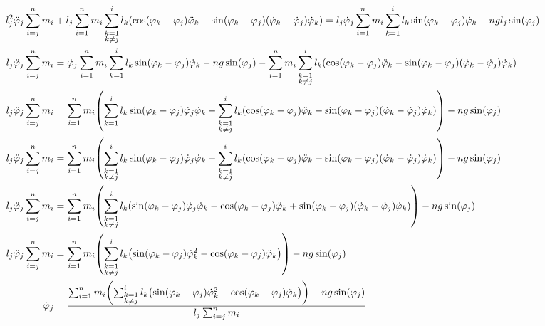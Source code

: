 \documentclass{article}
\renewcommand{\phi}{\varphi}
\begin{document}
\begin{align*}
  l_j^2 \ddot\phi_j \sum_{i=j}^n m_i &+ l_j \sum_{i=1}^n m_i \sum_{\substack{k=1\\k \neq j}}^i l_k \pqty{\cos(\phi_k - \phi_j) \ddot\phi_k - \sin(\phi_k - \phi_j)(\dot\phi_k - \dot\phi_j)\dot\phi_k} = l_j \dot\phi_j \sum_{i=1}^n m_i \sum_{k=1}^i l_k \sin(\phi_k - \phi_j) \dot\phi_k - n g l_j \sin(\phi_j) \\
  l_j \ddot\phi_j \sum_{i=j}^n m_i &= \dot\phi_j \sum_{i=1}^n m_i \sum_{k=1}^i l_k \sin(\phi_k - \phi_j) \dot\phi_k - n g \sin(\phi_j) - \sum_{i=1}^n m_i \sum_{\substack{k=1\\k \neq j}}^i l_k \pqty{\cos(\phi_k - \phi_j) \ddot\phi_k - \sin(\phi_k - \phi_j)(\dot\phi_k - \dot\phi_j)\dot\phi_k} \\
  l_j \ddot\phi_j \sum_{i=j}^n m_i &= \sum_{i=1}^n m_i \pqty{\sum_{k=1}^i l_k \sin(\phi_k - \phi_j) \dot\phi_j \dot\phi_k - \sum_{\substack{k=1\\k \neq j}}^i l_k \pqty{\cos(\phi_k - \phi_j) \ddot\phi_k - \sin(\phi_k - \phi_j)(\dot\phi_k - \dot\phi_j)\dot\phi_k}} - n g \sin(\phi_j) \\
  l_j \ddot\phi_j \sum_{i=j}^n m_i &= \sum_{i=1}^n m_i \pqty{\sum_{\substack{k=1\\k \neq j}}^i l_k \sin(\phi_k - \phi_j) \dot\phi_j \dot\phi_k - \sum_{\substack{k=1\\k \neq j}}^i l_k \pqty{\cos(\phi_k - \phi_j) \ddot\phi_k - \sin(\phi_k - \phi_j)(\dot\phi_k - \dot\phi_j)\dot\phi_k}} - n g \sin(\phi_j) \\
  l_j \ddot\phi_j \sum_{i=j}^n m_i &= \sum_{i=1}^n m_i \pqty{\sum_{\substack{k=1\\k \neq j}}^i l_k \pqty{\sin(\phi_k - \phi_j) \dot\phi_j \dot\phi_k - \cos(\phi_k - \phi_j) \ddot\phi_k + \sin(\phi_k - \phi_j)(\dot\phi_k - \dot\phi_j)\dot\phi_k}} - n g \sin(\phi_j) \\
  l_j \ddot\phi_j \sum_{i=j}^n m_i &= \sum_{i=1}^n m_i \pqty{\sum_{\substack{k=1\\k \neq j}}^i l_k \pqty{\sin(\phi_k - \phi_j) \dot\phi_k^2 - \cos(\phi_k - \phi_j) \ddot\phi_k}} - n g \sin(\phi_j) \\
  \ddot\phi_j &= \frac{\sum_{i=1}^n m_i \pqty{\sum_{\substack{k=1\\k \neq j}}^i l_k \pqty{\sin(\phi_k - \phi_j) \dot\phi_k^2 - \cos(\phi_k - \phi_j) \ddot\phi_k}} - n g \sin(\phi_j)}{l_j \sum_{i=j}^n m_i} \\
\end{align*}
\end{document}

